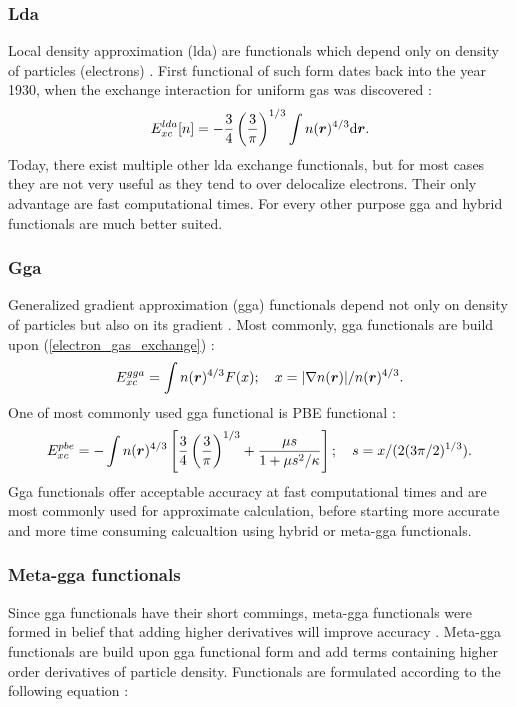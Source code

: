 \documentclass[openany, longbibliography,slovene,a4paper,12pt]{article}
\def\vec#1{\mbox{\boldmath$#1$}}
\newcommand{\dif}{\mathrm{d}}
\begin{document}
\subsubsection{Lda}
Local density approximation (lda) are functionals which depend only on
density of particles (electrons) \cite{challenges_den_fun_theor}.
First functional of such form dates back into
the year 1930, when the exchange interaction for uniform gas was discovered \cite{challenges_den_fun_theor}:
\begin{equation} \label{electron_gas_exchange}
E_{xc}^{lda}[n]=-\frac{3}{4}\left( \frac{3}{\pi} \right)^{1/3}\int n(\vec r)^{4/3} \dif \vec r.
\end{equation}
Today, there exist multiple other lda exchange functionals, but for most cases
they are not very useful as they tend to over delocalize electrons. Their only advantage are fast computational times.
For every other purpose gga and hybrid functionals are much better suited.

\subsubsection{Gga}
Generalized gradient approximation (gga) functionals
depend not only on density of particles but also on its gradient \cite{challenges_den_fun_theor}. Most commonly,
gga functionals are build upon (\ref{electron_gas_exchange}) \cite{challenges_den_fun_theor}:
\begin{equation}
  E_{xc}^{gga}=\int n(\vec r)^{4/3}F(x);\quad x=|\nabla n(\vec r)|/n(\vec r)^{4/3}.
\end{equation}
One of most commonly used gga functional is PBE functional
\cite{challenges_den_fun_theor} \cite{challenges_den_fun_theor}:
\begin{equation}
  E_{xc}^{pbe}=-\int  n(\vec r)^{4/3}\left[ \frac{3}{4}\left(\frac{3}{\pi}\right)^{1/3} + \frac{\mu s}{1+ \mu s^2/\kappa} \right]; \quad s=x/(2(3\pi/2)^{1/3}).
\end{equation}
Gga functionals offer acceptable accuracy at fast computational times and are
most commonly used for approximate calculation, before starting more accurate
and more time consuming calcualtion using hybrid or meta-gga functionals.

\subsubsection{Meta-gga functionals}
Since gga functionals have their short commings, meta-gga functionals were formed
in belief that adding higher derivatives will improve accuracy
\cite{challenges_den_fun_theor}. Meta-gga functionals are build upon gga
functional form and add terms containing higher order derivatives of particle
density. Functionals are formulated according to the following equation
\cite{challenges_den_fun_theor}:
\end{document}
